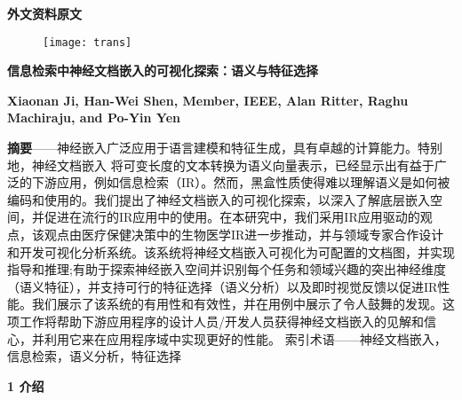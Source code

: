\pagestyle{empty}
\begin{center}
	{\Large {\textbf{外文资料原文}}}
\end{center}
\begin{figure}[h]
	\centering
	\texttt{[image: trans]}
	\label{pic-trans}
\end{figure}

\newpage
\begin{center}
	{\Large {\textbf{信息检索中神经文档嵌入的可视化探索：语义与特征选择}}}
\end{center}
\begin{center}
	{\large {\textbf{Xiaonan Ji, Han-Wei Shen, Member, IEEE, Alan Ritter, Raghu Machiraju, and Po-Yin Yen}}}
\end{center}

\textbf{摘要}——神经嵌入广泛应用于语言建模和特征生成，具有卓越的计算能力。特别地，神经文档嵌入 将可变长度的文本转换为语义向量表示，已经显示出有益于广泛的下游应用，例如信息检索（IR）。然而，黑盒性质使得难以理解语义是如何被编码和使用的。我们提出了神经文档嵌入的可视化探索，以深入了解底层嵌入空间，并促进在流行的IR应用中的使用。在本研究中，我们采用IR应用驱动的观点，该观点由医疗保健决策中的生物医学IR进一步推动，并与领域专家合作设计和开发可视化分析系统。该系统将神经文档嵌入可视化为可配置的文档图，并实现指导和推理;有助于探索神经嵌入空间并识别每个任务和领域兴趣的突出神经维度（语义特征），并支持可行的特征选择（语义分析）以及即时视觉反馈以促进IR性能。我们展示了该系统的有用性和有效性，并在用例中展示了令人鼓舞的发现。这项工作将帮助下游应用程序的设计人员/开发人员获得神经文档嵌入的见解和信心，并利用它来在应用程序域中实现更好的性能。
索引术语——神经文档嵌入，信息检索，语义分析，特征选择

\textbf{1 介绍}

